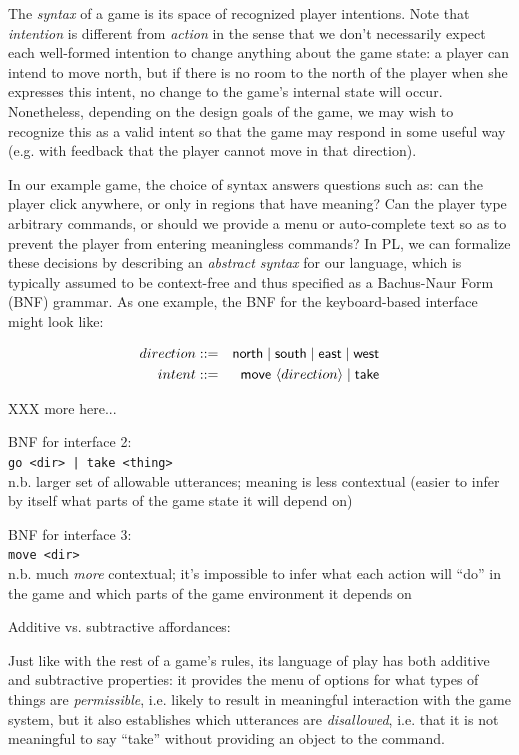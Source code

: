   The {\em syntax} of a game is its space of recognized player intentions.
  Note that {\em intention} is different from {\em action} in the sense
  that we don't necessarily expect each well-formed intention to change
  anything about the game state: a player can intend to move north, but if
  there is no room to the north of the player when she expresses this
  intent, no change to the game's internal state will occur. Nonetheless,
  depending on the design goals of the game, we may wish to recognize this
  as a valid intent so that the game may respond in some useful way (e.g.
  with feedback that the player cannot move in that direction).
  
  In our example game, the choice of syntax answers questions such as: can
  the player click anywhere, or only in regions that have meaning? Can the
  player type arbitrary commands, or should we provide a menu or
  auto-complete text so as to prevent the player from entering meaningless
  commands?
  In PL, we can formalize these decisions by describing an {\em abstract
  syntax} for our language, which is typically assumed to be context-free
  and thus specified as a Bachus-Naur Form (BNF) grammar. As one example,
  the BNF for the keyboard-based interface might look like:

  \begin{eqnarray*}
  direction &::=& \mathsf{north} \mid \mathsf{south} \mid \mathsf{east}
    \mid \mathsf{west} \\
  intent &::=& \mathsf{move}\  \langle direction \rangle \mid \mathsf{take}
  \end{eqnarray*}

  XXX more here...

  BNF for interface 2:\\
  \verb/go <dir> | take <thing>/\\
  n.b. larger set of allowable utterances; meaning is less contextual
  (easier to infer by itself what parts of the game state it will depend
  on)

  BNF for interface 3:\\
  \verb/move <dir>/\\
  n.b. much {\em more} contextual; it's impossible to infer what each
  action will ``do'' in the game and which parts of the game environment it
  depends on

  Additive vs. subtractive affordances:

  Just like with the rest of a game's rules, its language of play has both
  additive and subtractive properties: it provides the menu of options for
  what types of things are {\em permissible}, i.e. likely to result in
  meaningful interaction with the game system, but it also establishes
  which utterances are {\em disallowed}, i.e. that it is not meaningful to
  say ``take'' without providing an object to the command.

